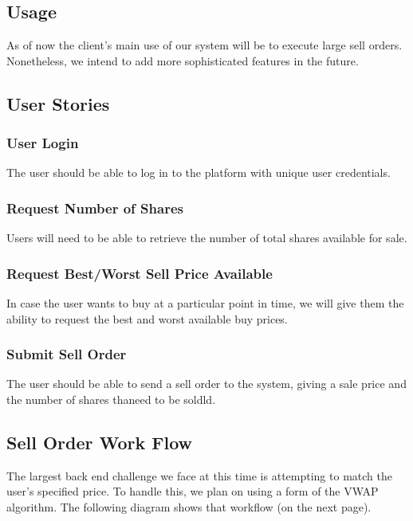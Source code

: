 \documentclass{article}
\begin{document}
\subsection{Usage}
As of now the client's main use of our system will be to execute large sell orders. Nonetheless, we intend to add more sophisticated features in the future.

\pagebreak
\subsection{User Stories}

\subsubsection{User Login}

The user should be able to log in to the platform with unique user credentials.

\subsubsection{Request Number of Shares}

Users will need to be able to retrieve the number of total shares available for sale.

\subsubsection{Request Best/Worst Sell Price Available}

In case the user wants to buy at a particular point in time, we will give them the ability to request the best and worst available buy prices. 

\subsubsection{Submit Sell Order}

The user should be able to send a sell order to the system, giving a sale price and the number of shares thaneed to be soldld.

\subsection{Sell Order Work Flow}

The largest back end challenge we face at this time is attempting to match the user's specified price. To handle this, we plan on using a form of the VWAP algorithm. The following diagram shows that workflow (on the next page).
\end{document}
